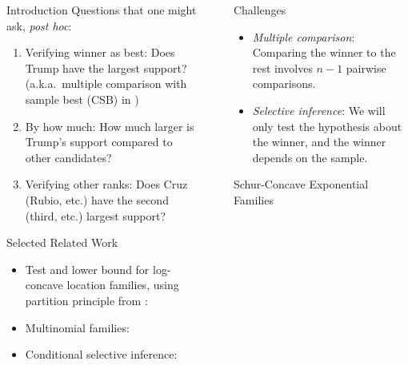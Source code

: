 \documentclass[final]{beamer}
\newlength{\sepwid}
\newlength{\onecolwid}
\begin{document}
\begin{frame}[t]
\begin{columns}[t]
\begin{column}{\onecolwid}
\begin{block}{Introduction}
Questions that one might ask, {\em post hoc}:
\begin{enumerate}
	\item Verifying winner as best: Does Trump have the largest support? (a.k.a.\ multiple comparison with sample best (CSB) in \citet{Stefansson:1988wj})
	\item By how much: How much larger is Trump's support compared to other candidates?
	\item Verifying other ranks: Does Cruz (Rubio, etc.) have the second (third, etc.) largest support?
\end{enumerate}

\end{block}

\begin{block}{Selected Related Work}

\begin{itemize}
	\item Test and lower bound for log-concave location families, using partition principle from \citet{Finner:2002ju}: \citet{Stefansson:1988wj}
	\item Multinomial families: \citet{Gupta:1967wg}
	\item Conditional selective inference: \citet{Fithian:2014ws}
\end{itemize}

\end{block}

\end{column}

\begin{column}{\sepwid}\end{column}

\begin{column}{\onecolwid}

\begin{block}{Challenges}

\begin{itemize}
	\item {\em Multiple comparison}: Comparing the winner to the rest involves $n-1$ pairwise comparisons.
	\item {\em Selective inference}: We will only test the hypothesis about the winner, and the winner depends on the sample.
\end{itemize}

\end{block}

\begin{block}{Schur-Concave Exponential Families}


\end{block}
\end{column}
\end{columns}
\end{frame}
\end{document}
